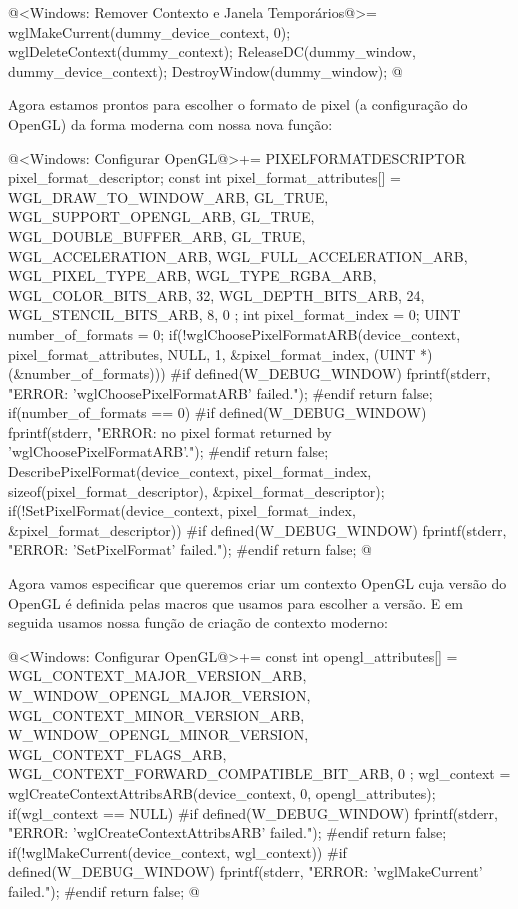 \iniciocodigo
@<Windows: Remover Contexto e Janela Temporários@>=
wglMakeCurrent(dummy_device_context, 0);
wglDeleteContext(dummy_context);
ReleaseDC(dummy_window, dummy_device_context);
DestroyWindow(dummy_window);
@
\fimcodigo

Agora estamos prontos para escolher o formato de pixel (a configuração
do OpenGL) da forma moderna com nossa nova função:

\iniciocodigo
@<Windows: Configurar OpenGL@>+=
{
  PIXELFORMATDESCRIPTOR pixel_format_descriptor;
  const int pixel_format_attributes[] = {
    WGL_DRAW_TO_WINDOW_ARB, GL_TRUE,
    WGL_SUPPORT_OPENGL_ARB, GL_TRUE,
    WGL_DOUBLE_BUFFER_ARB, GL_TRUE,
    WGL_ACCELERATION_ARB, WGL_FULL_ACCELERATION_ARB,
    WGL_PIXEL_TYPE_ARB, WGL_TYPE_RGBA_ARB,
    WGL_COLOR_BITS_ARB, 32,
    WGL_DEPTH_BITS_ARB, 24,
    WGL_STENCIL_BITS_ARB, 8,
    0 };
  int pixel_format_index = 0;
  UINT number_of_formats = 0;
  if(!wglChoosePixelFormatARB(device_context, pixel_format_attributes, NULL, 1,
                              &pixel_format_index,
                              (UINT *) (&number_of_formats))){
#if defined(W_DEBUG_WINDOW)
     fprintf(stderr, "ERROR: 'wglChoosePixelFormatARB' failed.\n");
#endif
     return false;
  }
  if(number_of_formats == 0){
#if defined(W_DEBUG_WINDOW)
     fprintf(stderr,
             "ERROR: no pixel format returned by 'wglChoosePixelFormatARB'.\n");
#endif
     return false;
  }
  DescribePixelFormat(device_context, pixel_format_index,
                      sizeof(pixel_format_descriptor), &pixel_format_descriptor);
  if(!SetPixelFormat(device_context, pixel_format_index,
                     &pixel_format_descriptor)){
#if defined(W_DEBUG_WINDOW)
    fprintf(stderr, "ERROR: 'SetPixelFormat' failed.\n");
#endif
    return false;
  }
}
@
\fimcodigo

Agora vamos especificar que queremos criar um contexto OpenGL cuja
versão do OpenGL é definida pelas macros que usamos para escolher a
versão. E em seguida usamos nossa função de criação de contexto
moderno:

\iniciocodigo
@<Windows: Configurar OpenGL@>+=
{
  const int opengl_attributes[] = {
    WGL_CONTEXT_MAJOR_VERSION_ARB, W_WINDOW_OPENGL_MAJOR_VERSION,
    WGL_CONTEXT_MINOR_VERSION_ARB, W_WINDOW_OPENGL_MINOR_VERSION,
    WGL_CONTEXT_FLAGS_ARB, WGL_CONTEXT_FORWARD_COMPATIBLE_BIT_ARB,
    0 };
  wgl_context = wglCreateContextAttribsARB(device_context, 0, opengl_attributes);
  if(wgl_context == NULL){
#if defined(W_DEBUG_WINDOW)
    fprintf(stderr, "ERROR: 'wglCreateContextAttribsARB' failed.\n");
#endif
    return false;
  }
  if(!wglMakeCurrent(device_context, wgl_context)){
#if defined(W_DEBUG_WINDOW)
    fprintf(stderr, "ERROR: 'wglMakeCurrent' failed.\n");
#endif
    return false;
  }
}
@
\fimcodigo

